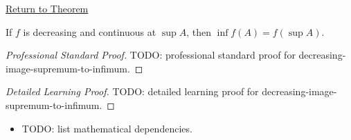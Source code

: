 \newpage
{}
\label{prf:decreasing-image-supremum-to-infimum}

\begin{remark*}[Return]
\hyperref[thm:decreasing-image-supremum-to-infimum]{Return to Theorem}
\end{remark*}

\begin{theorem*}
If $f$ is decreasing and continuous at $\sup A$, then
$\inf f(A)=f(\sup A)$.
\end{theorem*}

\begin{proof}[Professional Standard Proof]
\LRAProofBodyStart
TODO: professional standard proof for decreasing-image-supremum-to-infimum.
\end{proof}

\begin{proof}[Detailed Learning Proof]
\LRAProofBodyStart
TODO: detailed learning proof for decreasing-image-supremum-to-infimum.
\end{proof}

\begin{remark*}
\end{remark*}

\begin{dependencies}
\begin{itemize}
  \item TODO: list mathematical dependencies.
\end{itemize}
\end{dependencies}

\clearpage
